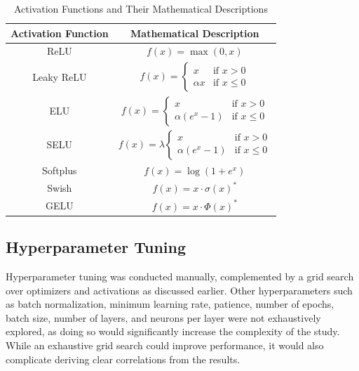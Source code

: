 \documentclass[12pt]{report}
\begin{document}
\begin{table}[H]
\centering
\caption{Activation Functions and Their Mathematical Descriptions}
\begin{tabular}{|c|c|}
\hline
\textbf{Activation Function} & \textbf{Mathematical Description} \\
\hline
ReLU & $f(x) = \max(0, x)$ \\
\hline
Leaky ReLU & $f(x) = \begin{cases} 
x & \text{if } x > 0 \\
\alpha x & \text{if } x \leq 0 
\end{cases}$ \\
\hline
ELU & $f(x) = \begin{cases} 
x & \text{if } x > 0 \\
\alpha (e^x - 1) & \text{if } x \leq 0 
\end{cases}$ \\
\hline
SELU & $f(x) = \lambda \begin{cases} 
x & \text{if } x > 0 \\
\alpha (e^x - 1) & \text{if } x \leq 0 
\end{cases}$ \\
\hline
Softplus & $f(x) = \log(1 + e^x)$ \\
\hline
Swish & $f(x) = x \cdot \sigma(x)^*$\\
\hline
GELU & $f(x) = x \cdot \Phi(x)^*$ \\
\hline
\end{tabular}
\end{table}


\subsection{Hyperparameter Tuning}

Hyperparameter tuning was conducted manually, complemented by a grid search over optimizers and activations as discussed earlier. Other hyperparameters such as batch normalization, minimum learning rate, patience, number of epochs, batch size, number of layers, and neurons per layer were not exhaustively explored, as doing so would significantly increase the complexity of the study. While an exhaustive grid search could improve performance, it would also complicate deriving clear correlations from the results.
\end{document}

